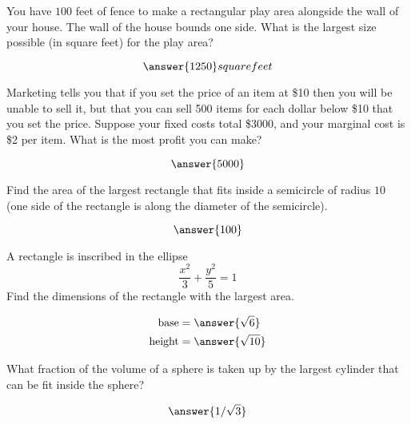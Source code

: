 \documentclass[handout]{ximera}
\begin{document}
\begin{exercise}
You have $100$ feet of fence to make a rectangular play area
  alongside the wall of your house.  The wall of the house bounds one
  side.  What is the largest size possible (in square feet) for the
  play area?

  \[
  \answer{1250} square feet
  \]

\end{exercise}


\begin{exercise}
Marketing tells you that if you set the price of an item at \$10
  then you will be unable to sell it, but that you can sell 500 items
  for each dollar below \$10 that you set the price.  Suppose your
  fixed costs total \$3000, and your marginal cost is \$2 per item.
  What is the most profit you can make?
  \begin{prompt}
  \[
  \answer{5000}
  \]
  \end{prompt}
\end{exercise}

\begin{exercise}
Find the area of the largest rectangle that fits inside a semicircle
  of radius $10$ (one side of the rectangle is along the diameter of
  the semicircle).

  \[
  \answer{100}
  \]

\end{exercise}

\begin{exercise}
A rectangle is inscribed in the ellipse
  \[
  \frac{x^2}{3}+\frac{y^2}{5}=1
  \]
  Find the dimensions of the rectangle with the largest area.

  \begin{align*}
  \text{base} &= \answer{\sqrt{6}}\\
  \text{height} &= \answer{\sqrt{10}}
  \end{align*}

\end{exercise}

\begin{exercise}
What fraction of the volume of a sphere is taken up by the largest cylinder
  that can be fit inside the sphere?

  \[
  \answer{1/\sqrt{3}}
  \]

\end{exercise}
\end{document}
